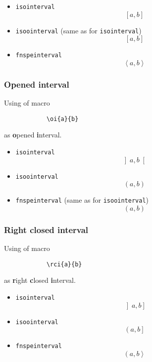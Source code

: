 \documentclass{article}
\begin{document}
		\begin{itemize}
			\item \texttt{isointerval}
				\begin{equation*}
					\left[ a , b \right]
				\end{equation*}
			\item \texttt{isoointerval} (same as for \texttt{isointerval})
				\begin{equation*}
					\left[ a , b \right]
				\end{equation*}
			\item \texttt{fnspeinterval}
				\begin{equation*}
					\left< a , b \right>
				\end{equation*}
		\end{itemize}
	
		\subsubsection*{Opened interval}
		Using of macro
		\begin{lstlisting}
			\oi{a}{b}
		\end{lstlisting}
		as \textbf{o}pened \textbf{i}nterval.
		
		\begin{itemize}
			\item \texttt{isointerval}
			\begin{equation*}
			\left] a , b \right[
			\end{equation*}
			\item \texttt{isoointerval}
			\begin{equation*}
			\left( a , b \right)
			\end{equation*}
			\item \texttt{fnspeinterval} (same as for \texttt{isoointerval})
			\begin{equation*}
			\left( a , b \right)
			\end{equation*}
		\end{itemize}
	
		\subsubsection*{Right closed interval}
		Using of macro
		\begin{lstlisting}
			\rci{a}{b}
		\end{lstlisting}
		as \textbf{r}ight \textbf{c}losed \textbf{i}nterval.
		
		\begin{itemize}
			\item \texttt{isointerval}
			\begin{equation*}
			\left] a , b \right]
			\end{equation*}
			\item \texttt{isoointerval}
			\begin{equation*}
			\left( a , b \right]
			\end{equation*}
			\item \texttt{fnspeinterval}
			\begin{equation*}
			\left( a , b \right>
			\end{equation*}
		\end{itemize}
	
\end{document}
